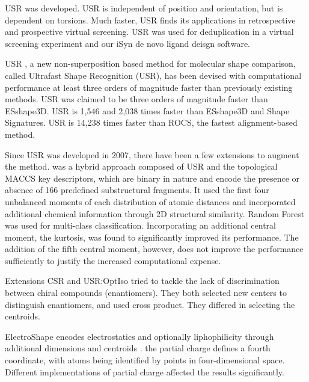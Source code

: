 USR \citep{1379,1280} was developed. USR is independent of position and orientation, but is dependent on torsions. Much faster, USR finds its applications in retrospective \citep{1332} and prospective \citep{1380} virtual screening. USR was used for deduplication in a virtual screening experiment \citep{1390} and our iSyn \citep{1381,1387} de novo ligand deisgn software. %

USR \citep{1379,1280}, a new non-superposition based method for molecular shape comparison, called Ultrafast Shape Recognition (USR), has been devised with computational performance at least three orders of magnitude faster than previously existing methods. USR was claimed to be three orders of magnitude faster than ESshape3D. USR is 1,546 and 2,038 times faster than ESshape3D and Shape Signatures. USR is 14,238 times faster than ROCS, the fastest alignment-based method.

Since USR was developed in 2007, there have been a few extensions \citep{1333,1334,1335,1337,1338,1331} to augment the method. \citep{1333} was a hybrid approach composed of USR and the topological MACCS key descriptors, which are binary in nature and encode the presence or absence of 166 predefined substructural fragments. It used the first four unbalanced moments of each distribution of atomic distances and incorporated additional chemical information through 2D structural similarity. Random Forest \citep{1310} was used for multi-class classification. Incorporating an additional central moment, the kurtosis, was found to significantly improved its performance. The addition of the fifth central moment, however, does not improve the performance sufficiently to justify the increased computational expense.

Extensions CSR \citep{1334} and USR:OptIso \citep{1335} tried to tackle the lack of discrimination between chiral compounds (enantiomers). They both selected new centers to distinguish enantiomers, and used cross product. They differed in selecting the centroids.

ElectroShape encodes electrostatics and optionally liphophilicity through additional dimensions and centroids \citep{1337,1338}. \citep{1337} the partial charge defines a fourth coordinate, with atoms being identified by points in four-dimensional space. Different implementations of partial charge affected the results significantly.

